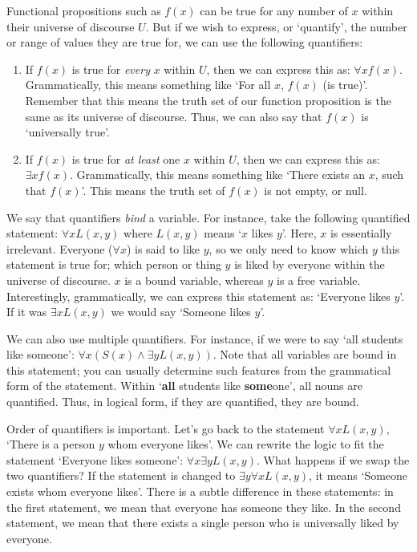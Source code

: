 \documentclass[a4paper, 11pt]{article}
\begin{document}
Functional propositions such as $f(x)$ can be true for any number of $x$ within their universe of discourse $U$. But if we wish to express, or `quantify', the number or range of values they are true for, we can use the following quantifiers:
\begin{enumerate}
  \item If $f(x)$ is true for \textit{every} $x$ within $U$, then we can express this as: $\forall x f(x)$. Grammatically, this means something like `For all $x$, $f(x)$ (is true)'. Remember that this means the truth set of our function proposition is the same as its universe of discourse. Thus, we can also say that $f(x)$ is `universally true'.
  \item If $f(x)$ is true for \textit{at least} one $x$ within $U$, then we can express this as: $\exists x f(x)$. Grammatically, this means something like `There exists an $x$, such that $f(x)$'. This means the truth set of $f(x)$ is not empty, or null.
\end{enumerate}

We say that quantifiers \textit{bind} a variable. For instance, take the following quantified statement: $\forall x L(x, y)$ where $L(x,y)$ means `$x$ likes $y$'. Here, $x$ is essentially irrelevant. Everyone ($\forall x$) is said to like $y$, so we only need to know which $y$ this statement is true for; which person or thing $y$ is liked by everyone within the universe of discourse. $x$ is a bound variable, whereas $y$ is a free variable. Interestingly, grammatically, we can express this statement as: `Everyone likes $y$'. If it was $\exists x L(x, y)$ we would say `Someone likes $y$'.

We can also use multiple quantifiers. For instance, if we were to say `all students like someone': $\forall x (S(x) \wedge \exists y L(x, y))$. Note that all variables are bound in this statement; you can usually determine such features from the grammatical form of the statement. Within `\textbf{all} students like \textbf{some}one', all nouns are quantified. Thus, in logical form, if they are quantified, they are bound.

Order of quantifiers is important. Let's go back to the statement $\forall x L(x, y)$, `There is a person $y$ whom everyone likes'. We can rewrite the logic to fit the statement `Everyone likes someone': $\forall x \exists y L(x,y)$. What happens if we swap the two quantifiers? If the statement is changed to $\exists y \forall x L(x,y)$, it means `Someone exists whom everyone likes'. There is a subtle difference in these statements: in the first statement, we mean that everyone has someone they like. In the second statement, we mean that there exists a single person who is universally liked by everyone.
\end{document}
